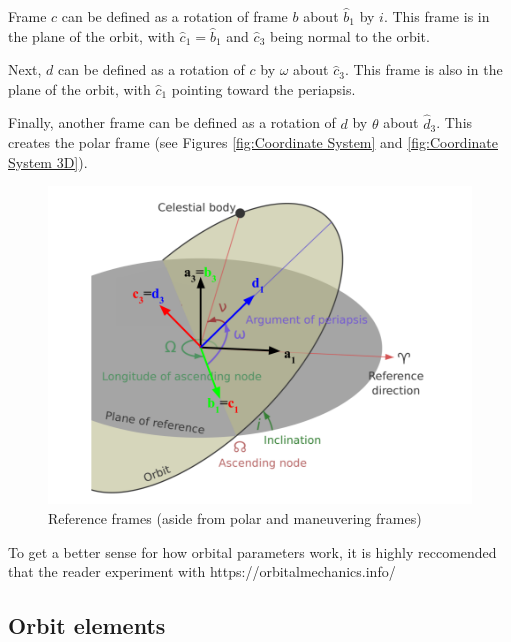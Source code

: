 \documentclass{article}
\begin{document}
Frame $c$ can be defined as a rotation of frame $b$ about $\hat{b}_1$ by $i$. This frame is in the plane of the orbit, with $\hat{c}_1=\hat{b}_1$ and $\hat{c}_3$ being normal to the orbit.

Next, $d$ can be defined as a rotation of $c$ by $\omega$ about $\hat{c}_3$. This frame is also in the plane of the orbit, with $\hat{c}_1$ pointing toward the periapsis.

Finally, another frame can be defined as a rotation of $d$ by $\theta$ about $\hat{d}_3$. This creates the polar frame (see Figures \ref{fig:Coordinate System} and \ref{fig:Coordinate System 3D}).

\begin{figure}[H]
    \centering
    \includegraphics[scale=0.3]{Frames}
    \caption{Reference frames (aside from polar and maneuvering frames)}\label{fig:Frames}
\end{figure}

To get a better sense for how orbital parameters work, it is highly reccomended that the reader experiment with https://orbitalmechanics.info/

\bigskip\bigskip
\subsection{Orbit elements}
\end{document}
